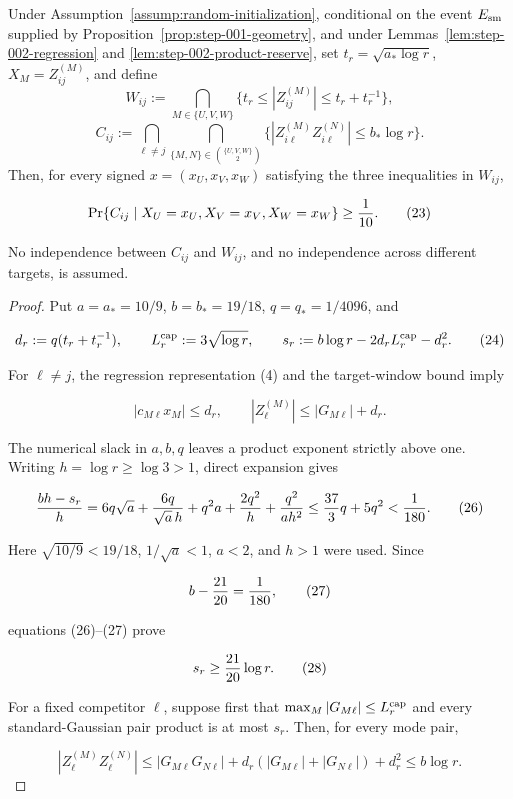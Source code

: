 \begin{proposition}\label{prop:step-002-conditional-competitors}
Under Assumption~\ref{assump:random-initialization}, conditional on the
event $E_{\rm sm}$ supplied by Proposition~\ref{prop:step-001-geometry},
and under Lemmas~\ref{lem:step-002-regression} and
\ref{lem:step-002-product-reserve}, set $t_r=\sqrt{a_*\log r}$,
$X_M=Z_{ij}^{(M)}$, and define
\[
W_{ij}:=\bigcap_{M\in\{U,V,W\}}
\{t_r\le|Z_{ij}^{(M)}|\le t_r+t_r^{-1}\},
\]
\[
C_{ij}:=\bigcap_{\ell\ne j}
\bigcap_{\{M,N\}\in\binom{\{U,V,W\}}2}
\{|Z_{i\ell}^{(M)}Z_{i\ell}^{(N)}|\le b_*\log r\}.
\]
Then, for every signed $x=(x_U,x_V,x_W)$ satisfying the three inequalities
in $W_{ij}$,

\[
\Pr\{C_{ij}\mid X_U=x_U,X_V=x_V,X_W=x_W\}\ge {1\over10}.
\tag{23}
\]

No independence between $C_{ij}$ and $W_{ij}$, and no independence across
different targets, is assumed.

\begin{proof}
Put $a=a_*=10/9$, $b=b_*=19/18$, $q=q_*=1/4096$, and

\[
d_r:=q(t_r+t_r^{-1}),\qquad
L_r^{\rm cap}:=3\sqrt{\log r},\qquad
s_r:=b\log r-2d_rL_r^{\rm cap}-d_r^2.
\tag{24}
\]

For $\ell\ne j$, the regression representation (4) and the target-window
bound imply

\[
|c_{M\ell}x_M|\le d_r,\qquad
|Z_{\ell}^{(M)}|\le |G_{M\ell}|+d_r.
\tag{25}
\]

The numerical slack in $a,b,q$ leaves a product exponent strictly above one.
Writing $h=\log r\ge\log3>1$, direct expansion gives

\[
{b h-s_r\over h}
=6q\sqrt a+{6q\over\sqrt a\,h}
+q^2a+{2q^2\over h}+{q^2\over a h^2}
\le {37\over3}q+5q^2<{1\over180}.
\tag{26}
\]

Here $\sqrt{10/9}<19/18$, $1/\sqrt a<1$, $a<2$, and $h>1$ were
used. Since

\[
b-{21\over20}={1\over180},
\tag{27}
\]

equations (26)--(27) prove

\[
s_r\ge {21\over20}\log r.
\tag{28}
\]

For a fixed competitor $\ell$, suppose first that
$\max_M|G_{M\ell}|\le L_r^{\rm cap}$ and every standard-Gaussian pair
product is at most $s_r$. Then, for every mode pair,

\[
|Z_{\ell}^{(M)}Z_{\ell}^{(N)}|
\le |G_{M\ell}G_{N\ell}|
+d_r(|G_{M\ell}|+|G_{N\ell}|)+d_r^2
\le b\log r.
\tag{29}
\]


\end{proof}
\end{proposition}
